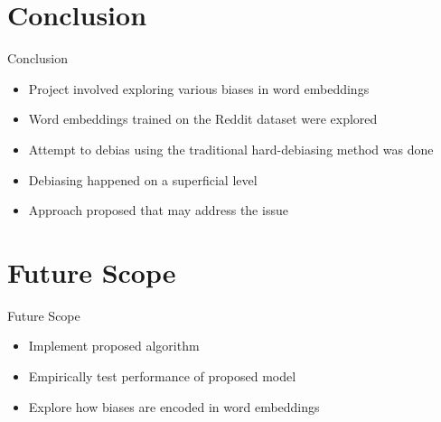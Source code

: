 \documentclass{beamer}
\begin{document}
		
	\section{Conclusion}
	\begin{frame}{Conclusion}
		\begin{itemize}
			\item Project involved exploring various biases in word embeddings
			\item Word embeddings trained on the Reddit dataset were explored
			\item Attempt to debias using the traditional hard-debiasing method was done
			\item Debiasing happened on a superficial level
			\item Approach proposed that may address the issue
		\end{itemize}
	\end{frame}

	\section{Future Scope}
	\begin{frame}{Future Scope}
		\begin{itemize}
			\item Implement proposed algorithm
			\item Empirically test performance of proposed model
			\item Explore how biases are encoded in word embeddings
		\end{itemize}
	\end{frame}
	
	
\end{document}
